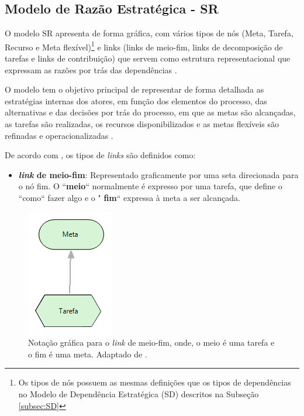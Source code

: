 \subsection{Modelo de Razão Estratégica - SR}
\label{subsec:SR}

O modelo SR apresenta de forma gráfica, com vários tipos de nós (Meta, Tarefa, Recurso e Meta flexível)\footnote[1]{Os tipos de nós possuem as mesmas definições que os tipos de dependências no Modelo de Dependência Estratégica (SD) descritos na Subseção \ref{subsec:SD}} e links (links de meio-fim, links de decomposição de tarefas e links de contribuição) que servem como estrutura representacional que expressam as razões por trás das dependências \cite{istarwiki20}.

O modelo tem o objetivo principal de representar de forma detalhada as estratégias internas dos atores, em função dos elementos do processo, das alternativas e das decisões por trás do processo, em que as metas são alcançadas, as tarefas são realizadas, os recursos disponibilizados e as metas flexíveis são refinadas e operacionalizadas \cite{napolitano2009estrategia}.  

De acordo com \cite{istarwiki20}, os tipos de \textit{links} são definidos como: 

\pagebreak

\begin{itemize}
	\item \textbf{\textit{link} de meio-fim}: Representado graficamente por uma seta direcionada para o nó fim. O ``\textbf{meio}`` normalmente é expresso por uma tarefa, que define o ``como`` fazer algo e o " \textbf{fim}`` expressa à meta a ser alcançada.
\end{itemize}

\begin{figure}[h!]
	\centering
	\includegraphics[keepaspectratio=true,scale=0.9]{figuras/meioFim.PNG}
	\caption{Notação gráfica para o \textit{link} de meio-fim, onde, o meio é uma tarefa e o fim é uma meta. Adaptado de \cite{istarwiki20}.}
	\label{meiofim}
\end{figure} 

